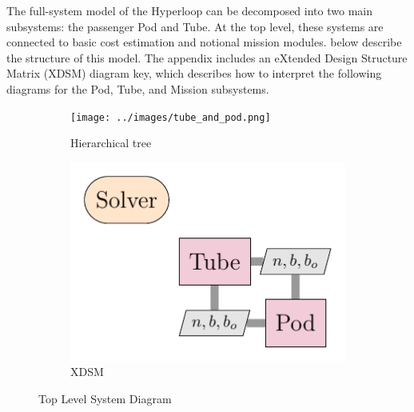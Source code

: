 The full-system model of the Hyperloop can be decomposed into two main
subsystems: the passenger Pod and Tube. At the top level, these systems are
connected to basic cost estimation and notional
mission modules.  below describe the structure of this model.
The appendix includes an eXtended Design Structure Matrix (XDSM) diagram key,
which describes how to interpret the following diagrams for the Pod, Tube, and Mission subsystems.

\begin{figure}
\centering
\begin{subfigure}[t]{.4\textwidth}
  \centering
  \texttt{[image: ../images/tube\_and\_pod.png]}
  \caption{Hierarchical tree}
  \label{fig:tree:tubeandpod}
\end{subfigure}%
\begin{subfigure}[t]{.6\textwidth}
  \centering
  \includegraphics[width=1.0\textwidth]{../images/xdsm/tube_and_pod.pdf}
  \caption{XDSM}
  \label{fig:xdsm:toplevel}
\end{subfigure}
\caption{Top Level System Diagram}
\label{fig:top}
\end{figure}

